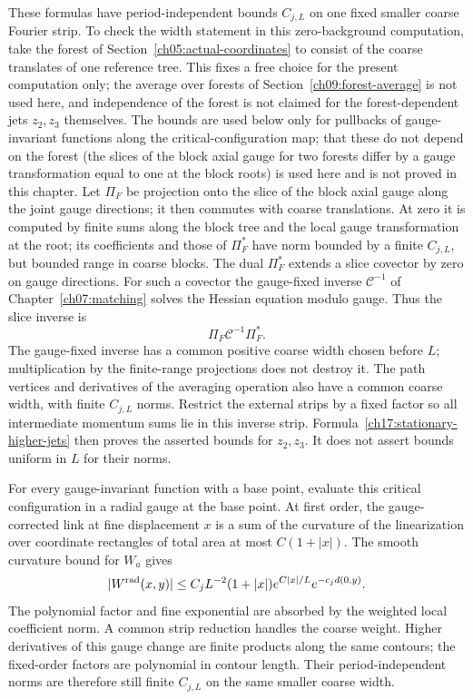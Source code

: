 These formulas have period-independent bounds $C_{j,L}$ on one
fixed smaller coarse Fourier strip. To check the width statement in this zero-background computation, take the forest of
Section~\ref{ch05:actual-coordinates} to consist of the coarse translates of one reference tree. This fixes a free choice for the present computation only; the average over forests of Section~\ref{ch09:forest-average} is not used here, and independence of the forest is not claimed for the forest-dependent jets $z_2,z_3$ themselves. The bounds are used below only for pullbacks of gauge-invariant functions along the critical-configuration map; that these do not depend on the forest (the slices of the block axial gauge for two forests differ by a gauge transformation equal to one at the block roots) is used here and is not proved in this chapter. Let $\Pi_F$ be projection onto the slice of the block axial gauge along the joint gauge
directions; it then commutes with coarse translations. At zero it is computed by finite sums along the block tree
and the local gauge transformation at the root; its coefficients and those of $\Pi_F^*$ have norm
bounded by a finite $C_{j,L}$, but bounded range in coarse blocks.
The dual $\Pi_F^*$ extends a slice covector by zero on gauge directions.
For such a covector the gauge-fixed inverse $\mathscr C^{-1}$ of
Chapter~\ref{ch07:matching} solves the Hessian equation modulo gauge.
Thus the slice inverse is
\[
                       \Pi_F\mathscr C^{-1}\Pi_F^*.
\]
The gauge-fixed inverse has a common positive coarse width chosen before
$L$; multiplication by the finite-range projections does not destroy it.
The path vertices and derivatives of the averaging operation also have a common coarse
width, with finite $C_{j,L}$ norms. Restrict the external strips by a
fixed factor so all intermediate momentum sums lie in this inverse
strip. Formula~\eqref{ch17:stationary-higher-jets} then proves the
asserted bounds for $z_2,z_3$. It does not assert bounds uniform in $L$
for their norms.

For every gauge-invariant function with a base point, evaluate this critical
configuration in a radial gauge at the base point. At first order, the gauge-corrected
link at fine displacement $x$ is a sum of the curvature of the linearization over
coordinate rectangles of total area at most $C(1+|x|)$. The smooth
curvature bound for $W_a$ gives
\[
 |W^{\rm rad}(x,y)|
 \le C_jL^{-2}(1+|x|)
                   e^{C|x|/L}e^{-c_jd(0,y)}.
\]
The polynomial factor and fine exponential are absorbed by the weighted
local coefficient norm. A common strip reduction handles the coarse
weight. Higher derivatives of this gauge change are finite products
along the same contours; the fixed-order factors are polynomial in contour
length. Their period-independent norms are therefore still finite
$C_{j,L}$ on the same smaller coarse width.

